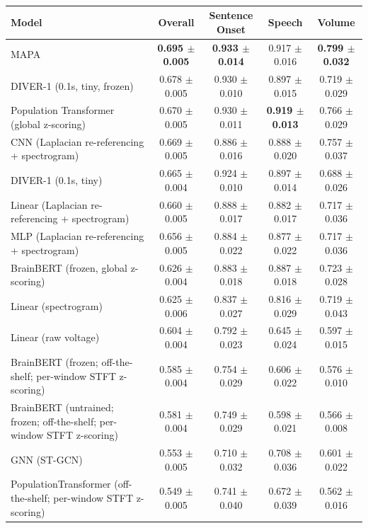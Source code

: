 \begin{table}[!htbp]
\small
{}\\[0.4em]
\hspace*{-2.5cm}\begin{tabular}{>{\raggedright\arraybackslash}p{8cm}cccc}
\hline
Model & Overall & Sentence Onset & Speech & Volume \\
\hline
MAPA & \textbf{0.695 $\pm$ 0.005} & \textbf{0.933 $\pm$ 0.014} & 0.917 $\pm$ 0.016 & \textbf{0.799 $\pm$ 0.032} \\
DIVER-1 (0.1s, tiny, frozen) & 0.678 $\pm$ 0.005 & 0.930 $\pm$ 0.010 & 0.897 $\pm$ 0.015 & 0.719 $\pm$ 0.029 \\
Population Transformer (global z-scoring) & 0.670 $\pm$ 0.005 & 0.930 $\pm$ 0.011 & \textbf{0.919 $\pm$ 0.013} & 0.766 $\pm$ 0.029 \\
CNN (Laplacian re-referencing + spectrogram) & 0.669 $\pm$ 0.005 & 0.886 $\pm$ 0.016 & 0.888 $\pm$ 0.020 & 0.757 $\pm$ 0.037 \\
DIVER-1 (0.1s, tiny) & 0.665 $\pm$ 0.004 & 0.924 $\pm$ 0.010 & 0.897 $\pm$ 0.014 & 0.688 $\pm$ 0.026 \\
Linear (Laplacian re-referencing + spectrogram) & 0.660 $\pm$ 0.005 & 0.888 $\pm$ 0.017 & 0.882 $\pm$ 0.017 & 0.717 $\pm$ 0.036 \\
MLP (Laplacian re-referencing + spectrogram) & 0.656 $\pm$ 0.005 & 0.884 $\pm$ 0.022 & 0.877 $\pm$ 0.022 & 0.717 $\pm$ 0.036 \\
BrainBERT (frozen, global z-scoring) & 0.626 $\pm$ 0.004 & 0.883 $\pm$ 0.018 & 0.887 $\pm$ 0.018 & 0.723 $\pm$ 0.028 \\
Linear (spectrogram) & 0.625 $\pm$ 0.006 & 0.837 $\pm$ 0.027 & 0.816 $\pm$ 0.029 & 0.719 $\pm$ 0.043 \\
Linear (raw voltage) & 0.604 $\pm$ 0.004 & 0.792 $\pm$ 0.023 & 0.645 $\pm$ 0.024 & 0.597 $\pm$ 0.015 \\
BrainBERT (frozen; off-the-shelf; per-window STFT z-scoring) & 0.585 $\pm$ 0.004 & 0.754 $\pm$ 0.029 & 0.606 $\pm$ 0.022 & 0.576 $\pm$ 0.010 \\
BrainBERT (untrained; frozen; off-the-shelf; per-window STFT z-scoring) & 0.581 $\pm$ 0.004 & 0.749 $\pm$ 0.029 & 0.598 $\pm$ 0.021 & 0.566 $\pm$ 0.008 \\
GNN (ST-GCN) & 0.553 $\pm$ 0.005 & 0.710 $\pm$ 0.032 & 0.708 $\pm$ 0.036 & 0.601 $\pm$ 0.022 \\
PopulationTransformer (off-the-shelf; per-window STFT z-scoring) & 0.549 $\pm$ 0.005 & 0.741 $\pm$ 0.040 & 0.672 $\pm$ 0.039 & 0.562 $\pm$ 0.016 \\

\end{tabular}
\end{table}
